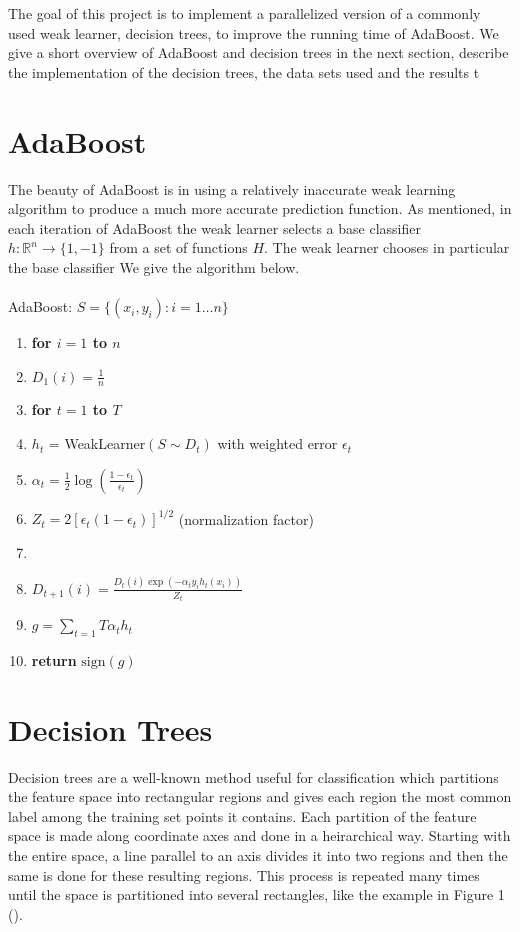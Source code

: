 \documentclass[12pt]{article}
\begin{document}
The goal of this project is to implement a parallelized version of a commonly used weak learner, decision trees, to improve the running time of AdaBoost. We give a short overview of AdaBoost and decision trees in the next section, describe the implementation of the decision trees, the data sets used and the results t 

\section{AdaBoost}
The beauty of AdaBoost is in using a relatively inaccurate weak learning algorithm to produce a much more accurate prediction function. As mentioned, in each iteration of AdaBoost the weak learner selects a base classifier $h: \mathbb{R}^n\rightarrow\{1,-1\}$ from a set of functions $H$. The weak learner chooses in particular the base classifier  We give the algorithm below.\\
\\
{\sc AdaBoost}: $S = \{(x_i,y_i):i = 1\ldots n\}$
\begin{enumerate}
\itemsep1pt \parskip0pt 
\item {\bf for $i=1$ to $n$}
\item \quad $D_1(i) = \frac{1}{n}$
\item {\bf for $t=1$ to $T$}
\item \quad $h_t$ = {\sc WeakLearner}$(S\sim D_t)$ with weighted error $\epsilon_t$
\item \quad $\alpha_t = \frac{1}{2}\log(\frac{1-\epsilon_t}{\epsilon_t})$
\item \quad $Z_t = 2[\epsilon_t(1-\epsilon_t)]^{1/2}$ (normalization factor)
\item {}
\item \quad \quad $D_{t+1}(i) = \frac{D_t(i)\exp(-\alpha_t y_i h_t(x_i))}{Z_t}$
\item $g = \sum_{t=1}{T} \alpha_t h_t$
\item {\bf return} $\mbox{sign}(g)$
\end{enumerate}



\section{Decision Trees}
Decision trees are a well-known method useful for classification which partitions the feature space into rectangular regions and gives each region the most common label among the training set points it contains. Each partition of the feature space is made along coordinate axes and done in a heirarchical way. Starting with the entire space, a line parallel to an axis divides it into two regions and then the same is done for these resulting regions. This process is repeated many times until the space is partitioned into several rectangles, like the example in Figure 1 (\cite{HTF}).
\begin{figure}
\end{figure}
\end{document}
